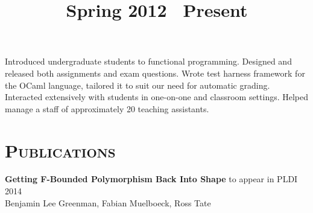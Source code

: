 \begin{resume}
\title{Spring 2012 \textendash\ Present}
\location{}
\begin{position}
Introduced undergraduate students to functional programming.
Designed and released both assignments and exam questions. 
Wrote test harness framework for the OCaml language, tailored it to suit our need for automatic grading.
Interacted extensively with students in one-on-one and classroom settings.
Helped manage a staff of approximately 20 teaching assistants.
\end{position}




\vfill

\renewcommand*\arraystretch{1.2}
\section{\textsc{Publications}}

\textbf{Getting F-Bounded Polymorphism Back Into Shape} \hfill to appear in PLDI 2014\\
Benjamin Lee Greenman, Fabian Muelboeck, Ross Tate


\end{resume}
